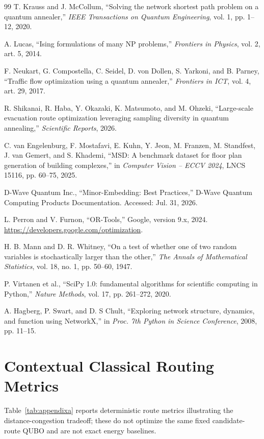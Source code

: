 \documentclass[11pt]{article}
\begin{document}
\begin{thebibliography}{99}
 T. Krauss and J. McCollum, ``Solving the network shortest path problem on a quantum annealer,'' \textit{IEEE Transactions on Quantum Engineering}, vol. 1, pp. 1--12, 2020.

 A. Lucas, ``Ising formulations of many NP problems,'' \textit{Frontiers in Physics}, vol. 2, art. 5, 2014.

 F. Neukart, G. Compostella, C. Seidel, D. von Dollen, S. Yarkoni, and B. Parney, ``Traffic flow optimization using a quantum annealer,'' \textit{Frontiers in ICT}, vol. 4, art. 29, 2017.

 R. Shikanai, R. Haba, Y. Okazaki, K. Matsumoto, and M. Ohzeki, ``Large-scale evacuation route optimization leveraging sampling diversity in quantum annealing,'' \textit{Scientific Reports}, 2026.

 C. van Engelenburg, F. Mostafavi, E. Kuhn, Y. Jeon, M. Franzen, M. Standfest, J. van Gemert, and S. Khademi, ``MSD: A benchmark dataset for floor plan generation of building complexes,'' in \textit{Computer Vision -- ECCV 2024}, LNCS 15116, pp. 60--75, 2025.

 D-Wave Quantum Inc., ``Minor-Embedding: Best Practices,'' D-Wave Quantum Computing Products Documentation. Accessed: Jul. 31, 2026.

 L. Perron and V. Furnon, ``OR-Tools,'' Google, version 9.x, 2024. \url{https://developers.google.com/optimization}.

 H. B. Mann and D. R. Whitney, ``On a test of whether one of two random variables is stochastically larger than the other,'' \textit{The Annals of Mathematical Statistics}, vol. 18, no. 1, pp. 50--60, 1947.

 P. Virtanen et al., ``SciPy 1.0: fundamental algorithms for scientific computing in Python,'' \textit{Nature Methods}, vol. 17, pp. 261--272, 2020.

 A. Hagberg, P. Swart, and D. S Chult, ``Exploring network structure, dynamics, and function using NetworkX,'' in \textit{Proc. 7th Python in Science Conference}, 2008, pp. 11--15.

\end{thebibliography}

\appendix

\section{Contextual Classical Routing Metrics}
Table~\ref{tab:appendixa} reports deterministic route metrics illustrating the distance-congestion tradeoff; these do not optimize the same fixed candidate-route QUBO and are not exact energy baselines.
\end{document}
